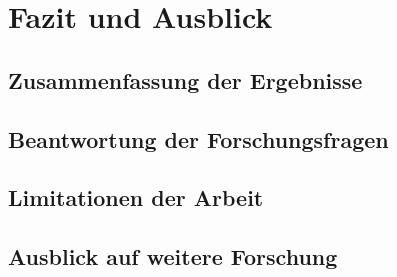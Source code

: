 
\chapter{Fazit und Ausblick}
\label{ch:fazit}

\section{Zusammenfassung der Ergebnisse}
\label{sec:zusammenfassung}

\section{Beantwortung der Forschungsfragen}
\label{sec:beantwortung-ff}

\section{Limitationen der Arbeit}
\label{sec:limitationen}

\section{Ausblick auf weitere Forschung}
\label{sec:ausblick}
